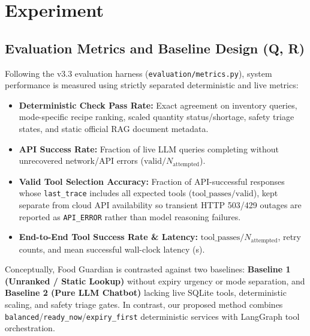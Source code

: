 \documentclass[conference]{IEEEtran}
\begin{document}
\section{Experiment}

\subsection{Evaluation Metrics and Baseline Design (Q, R)}
Following the v3.3 evaluation harness (\texttt{evaluation/metrics.py}), system performance is measured using strictly separated deterministic and live metrics:
\begin{itemize}
    \item \textbf{Deterministic Check Pass Rate:} Exact agreement on inventory queries, mode-specific recipe ranking, scaled quantity status/shortage, safety triage states, and static official RAG document metadata.
    \item \textbf{API Success Rate:} Fraction of live LLM queries completing without unrecovered network/API errors ($\text{valid} / N_{\text{attempted}}$).
    \item \textbf{Valid Tool Selection Accuracy:} Fraction of API-successful responses whose \texttt{last\_trace} includes all expected tools ($\text{tool\_passes} / \text{valid}$), kept separate from cloud API availability so transient HTTP 503/429 outages are reported as \texttt{API\_ERROR} rather than model reasoning failures.
    \item \textbf{End-to-End Tool Success Rate & Latency:} $\text{tool\_passes} / N_{\text{attempted}}$, retry counts, and mean successful wall-clock latency (s).
\end{itemize}

Conceptually, Food Guardian is contrasted against two baselines: \textbf{Baseline 1 (Unranked / Static Lookup)} without expiry urgency or mode separation, and \textbf{Baseline 2 (Pure LLM Chatbot)} lacking live SQLite tools, deterministic scaling, and safety triage gates. In contrast, our proposed method combines \texttt{balanced}/\texttt{ready\_now}/\texttt{expiry\_first} deterministic services with LangGraph tool orchestration.

\end{document}
